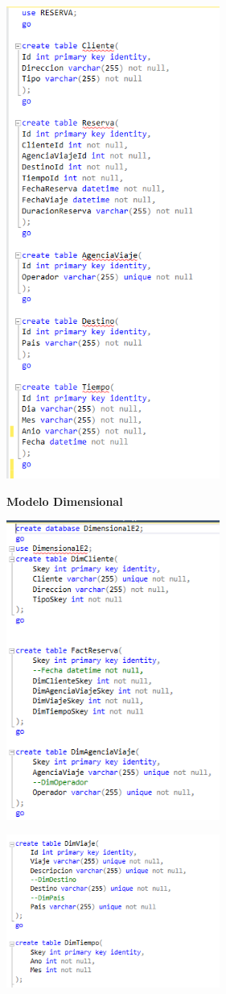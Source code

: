\begin{center}
\includegraphics[width=7cm]{./Imagenes/reservacodigo}
\end{center}

\textbf{Modelo Dimensional}
\begin{center}
\includegraphics[width=7cm]{./Imagenes/24}
\end{center}
\begin{center}
\includegraphics[width=7cm]{./Imagenes/25}
\end{center}


